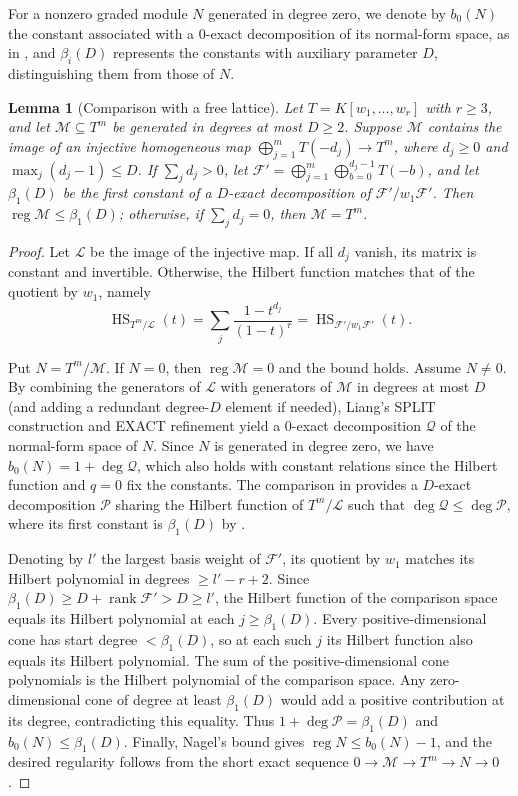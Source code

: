 \documentclass[12pt]{amsart}
\numberwithin{equation}{section}
\newtheorem{lemma}[theorem]{Lemma}
\theoremstyle{definition}
\theoremstyle{remark}
\numberwithin{equation}{section}
\DeclareMathOperator{\reg}{reg}
\begin{document}
For a nonzero graded module $N$ generated in degree zero, we denote by $b_0(N)$ the constant associated with a $0$-exact decomposition of its
normal-form space, as in \cite[Proposition~2.10]{Nagel},
and $\beta_i(D)$ represents the constants with auxiliary parameter $D$, distinguishing them from those of $N$.

\begin{lemma}[Comparison with a free lattice]
\label{lem:free-lattice-exact}
Let $T=K[w_1,\ldots,w_r]$ with $r\ge3$, and let $\mathcal M\subseteq T^m$ be generated in degrees at most $D\ge2$. Suppose $\mathcal M$ contains the image of an injective homogeneous map $\bigoplus_{j=1}^mT(-d_j)\to T^m$, where $d_j\ge0$ and $\max_j(d_j-1)\le D$. If $\sum_jd_j>0$, let $\mathcal F'=\bigoplus_{j=1}^m\bigoplus_{b=0}^{d_j-1}T(-b)$, and let $\beta_1(D)$ be the first constant of a $D$-exact decomposition of $\mathcal F'/w_1\mathcal F'$. Then $\reg\mathcal M\le\beta_1(D)$; otherwise, if $\sum_jd_j=0$, then $\mathcal M=T^m$.
\end{lemma}
\begin{proof}
Let $\mathcal L$ be the image of the injective map. If all $d_j$ vanish, its matrix is constant and invertible. Otherwise, the Hilbert function matches that of the quotient by $w_1$, namely
\[
\operatorname{HS}_{T^m/\mathcal L}(t) = \sum_j\frac{1-t^{d_j}}{(1-t)^r} = \operatorname{HS}_{\mathcal F'/w_1\mathcal F'}(t).
\]

Put $N=T^m/\mathcal M$.  If $N=0$, then $\reg\mathcal M=0$ and the bound holds. Assume $N\ne0$.  By combining the generators of $\mathcal L$ with generators of $\mathcal M$ in degrees at most $D$ (and adding a redundant degree-$D$ element if needed), Liang's SPLIT construction and EXACT refinement \cite[Theorem 20 and Lemma 24]{Liang} yield a $0$-exact decomposition $\mathcal{Q}$ of the normal-form space of $N$. Since $N$ is generated in degree zero, we have $b_0(N)=1+\deg\mathcal Q$, which also holds with constant relations since the Hilbert function and $q=0$ fix the constants. The comparison in \cite[Lemma 28]{Liang} provides a $D$-exact decomposition $\mathcal P$ sharing the Hilbert function of $T^m/\mathcal L$ such that $\deg\mathcal Q\le\deg\mathcal P$, where its first constant is $\beta_1(D)$ by \cite[Lemma 26]{Liang}.

Denoting by $l'$ the largest basis weight of $\mathcal F'$, its quotient by $w_1$ matches its Hilbert polynomial in degrees $\ge l'-r+2$.   Since $\beta_1(D)\ge D+\operatorname{rank}\mathcal F'>D\ge l'$, the Hilbert function of the comparison space equals its Hilbert polynomial at each $j\ge\beta_1(D)$. Every positive-dimensional cone has start degree $<\beta_1(D)$, so at each such $j$ its Hilbert function also equals its Hilbert polynomial. The sum of the positive-dimensional cone polynomials is the Hilbert polynomial of the comparison space. Any zero-dimensional cone of degree at least $\beta_1(D)$ would add a positive contribution at its degree, contradicting this equality. Thus $1+\deg\mathcal P=\beta_1(D)$ and $b_0(N)\le\beta_1(D)$. Finally, Nagel's bound \cite[Theorem 4.9]{Nagel} gives $\reg N\le b_0(N)-1$, and the desired regularity follows from the short exact sequence $0\to\mathcal M\to T^m\to N\to0$.
\end{proof}
\end{document}
